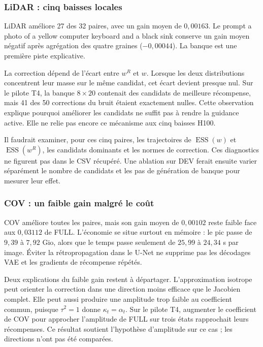 \documentclass[11pt,a4paper]{article}
\newcommand{\ESS}{\operatorname{ESS}}
\begin{document}
\subsubsection*{LiDAR : cinq baisses locales}
LiDAR améliore 27 des 32 paires, avec un gain moyen de $0{,}00163$. Le prompt \og a photo of a yellow computer keyboard and a black sink\fg{} conserve un gain moyen négatif après agrégation des quatre graines ($-0{,}00044$). La banque est une première piste explicative.

La correction dépend de l'écart entre $w^R$ et $w$. Lorsque les deux distributions concentrent leur masse sur le même candidat, cet écart devient presque nul. Sur le pilote T4, la banque $8\times20$ contenait des candidats de meilleure récompense, mais 41 des 50 corrections du bruit étaient exactement nulles. Cette observation explique pourquoi améliorer les candidats ne suffit pas à rendre la guidance active. Elle ne relie pas encore ce mécanisme aux cinq baisses H100.

Il faudrait examiner, pour ces cinq paires, les trajectoires de $\ESS(w)$ et $\ESS(w^R)$, les candidats dominants et les normes de correction. Ces diagnostics ne figurent pas dans le CSV récupéré. Une ablation sur DEV ferait ensuite varier séparément le nombre de candidats et les pas de génération de banque pour mesurer leur effet.

\subsubsection*{COV : un faible gain malgré le coût}
COV améliore toutes les paires, mais son gain moyen de $0{,}00102$ reste faible face aux $0{,}03112$ de FULL. L'économie se situe surtout en mémoire : le pic passe de $9{,}39$ à $7{,}92$ Gio, alors que le temps passe seulement de $25{,}99$ à $24{,}34$ s par image. Éviter la rétropropagation dans le U-Net ne supprime pas les décodages VAE et les gradients de récompense répétés.

Deux explications du faible gain restent à départager. L'approximation isotrope peut orienter la correction dans une direction moins efficace que le Jacobien complet. Elle peut aussi produire une amplitude trop faible au coefficient commun, puisque $\tau^2=1$ donne $\kappa_t=\alpha_t$. Sur le pilote T4, augmenter le coefficient de COV pour approcher l'amplitude de FULL sur trois états rapprochait leurs récompenses. Ce résultat soutient l'hypothèse d'amplitude sur ce cas ; les directions n'ont pas été comparées.
\end{document}
